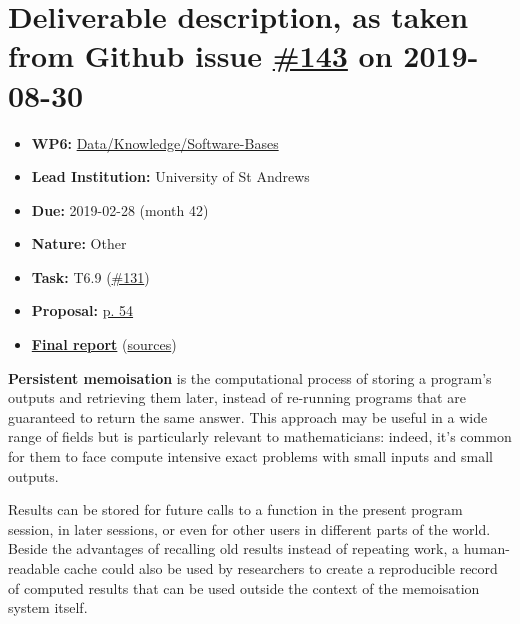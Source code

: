 \hypertarget{deliverable-description-as-taken-from-github-issue-143-on-2019-08-30}{%
\section*{\texorpdfstring{Deliverable description, as taken from Github
issue
\href{https://github.com/OpenDreamKit/OpenDreamKit/issues/143}{\#143} on
2019-08-30}{Deliverable description, as taken from Github issue \#143 on 2019-08-30}}\label{deliverable-description-as-taken-from-github-issue-143-on-2019-08-30}}

\begin{itemize}
\tightlist
\item
  \textbf{WP6:}
  \href{https://github.com/OpenDreamKit/OpenDreamKit/tree/master/WP6}{Data/Knowledge/Software-Bases}
\item
  \textbf{Lead Institution:} University of St Andrews
\item
  \textbf{Due:} 2019-02-28 (month 42)
\item
  \textbf{Nature:} Other
\item
  \textbf{Task:} T6.9
  (\href{https://github.com/OpenDreamKit/OpenDreamKit/issues/131}{\#131})
\item
  \textbf{Proposal:}
  \href{https://github.com/OpenDreamKit/OpenDreamKit/raw/master/Proposal/proposal-www.pdf}{p.
  54}
\item
  \textbf{\href{https://github.com/OpenDreamKit/OpenDreamKit/raw/master/WP6/D6.9/report-final.pdf}{Final
  report}}
  (\href{https://github.com/OpenDreamKit/OpenDreamKit/raw/master/WP6/D6.9/}{sources})
\end{itemize}

\textbf{Persistent memoisation} is the computational process of storing
a program's outputs and retrieving them later, instead of re-running
programs that are guaranteed to return the same answer. This approach
may be useful in a wide range of fields but is particularly relevant to
mathematicians: indeed, it's common for them to face compute intensive
exact problems with small inputs and small outputs.

Results can be stored for future calls to a function in the present
program session, in later sessions, or even for other users in different
parts of the world. Beside the advantages of recalling old results
instead of repeating work, a human-readable cache could also be used by
researchers to create a reproducible record of computed results that can
be used outside the context of the memoisation system itself.


